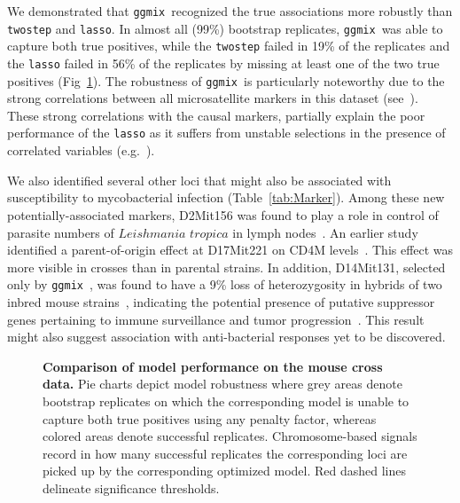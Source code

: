 \documentclass[10pt,letterpaper]{article}
\newcommand{\ggmix}{\texttt{ggmix}}
\begin{document}
	We demonstrated that \ggmix ~recognized the true associations more robustly than \texttt{twostep} and \texttt{lasso}. In almost all (99\%) bootstrap replicates, \ggmix ~was able to capture both true positives, while the \texttt{twostep} failed in 19\% of the replicates and the \texttt{lasso} failed in 56\% of the replicates by missing at least one of the two true positives (Fig~\ref{fig:Mice-comparison-fixTPR}). The robustness of \ggmix ~is particularly noteworthy due to the strong correlations between all microsatellite markers in this dataset (see~). These strong correlations with the causal markers, partially explain the poor performance of the \texttt{lasso} as it suffers from unstable selections in the presence of correlated variables (e.g.~\cite{wang2018precision}).
	
	
	We also identified several other loci that might also be associated with susceptibility to mycobacterial infection (Table~\ref{tab:Marker}). Among these new potentially-associated markers, D2Mit156 was found to play a role in control of parasite numbers of $Leishmania$ $tropica$ in lymph nodes~\cite{sohrabi2013mapping}. An earlier study identified a parent-of-origin effect at D17Mit221 on CD4M levels~\cite{jackson1999multiple}. This effect was more visible in crosses than in parental strains. In addition, D14Mit131, selected only by \ggmix ~, was found to have a 9\% loss of heterozygosity in hybrids of two inbred mouse strains~\cite{c2000allelotype}, indicating the potential presence of putative suppressor genes pertaining to immune surveillance and tumor progression~\cite{lasko1991loss}. This result might also suggest association with anti-bacterial responses yet to be discovered. 
	


\begin{figure}[!h]
	\caption{{\bf Comparison of model performance on the mouse cross data.}
		Pie charts depict model robustness where grey areas denote bootstrap replicates on which the corresponding model is unable to capture both true positives using any penalty factor, whereas colored areas denote successful replicates. Chromosome-based signals record in how many successful replicates the corresponding loci are picked up by the corresponding optimized model. Red dashed lines delineate significance thresholds.}\label{fig:Mice-comparison-fixTPR}
\end{figure}
\end{document}

